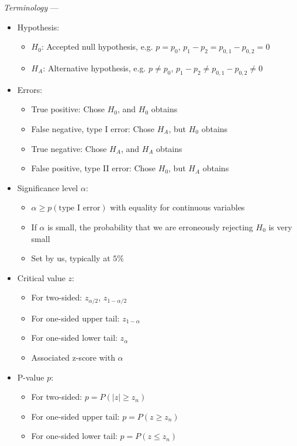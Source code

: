 \emph{Terminology} ---
\begin{itemize}
    \item Hypothesis:
    \begin{itemize}
        \item $H_0$: Accepted null hypothesis, e.g. $p=p_0$, $p_1-p_2=p_{0,1}-p_{0,2}=0$
        \item $H_A$: Alternative hypothesis, e.g. $p \neq p_0$, $p_1-p_2 \neq p_{0,1}-p_{0,2} \neq 0$
    \end{itemize}
    \item Errors:
    \begin{itemize}
        \item True positive: Chose $H_0$, and $H_0$ obtains
        \item False negative, type I error: Chose $H_A$, but $H_0$ obtains
        \item True negative: Chose $H_A$, and $H_A$ obtains
        \item False positive, type II error: Chose $H_0$, but $H_A$ obtains
    \end{itemize}
    \item Significance level $\alpha$: 
    \begin{itemize}
        \item $\alpha \geq p(\textrm{type I error})$ with equality for continuous variables
        \item If $\alpha$ is small, the probability that we are erroneously rejecting $H_0$ is very small
        \item Set by us, typically at $5\%$
    \end{itemize}
    \item Critical value $z$: 
    \begin{itemize}
        \item For two-sided: $z_{\alpha/2}$, $z_{1 - \alpha/2}$
        \item For one-sided upper tail: $z_{1 - \alpha}$
        \item For one-sided lower tail: $z_{\alpha}$
        \item Associated z-score with $\alpha$
    \end{itemize}
    \item P-value $p$: 
    \begin{itemize}
        \item For two-sided: $p = P(|z| \geq z_n)$
        \item For one-sided upper tail: $p = P(z \geq z_n)$
        \item For one-sided lower tail: $p = P(z \leq z_n)$

\end{itemize}
\end{itemize}

